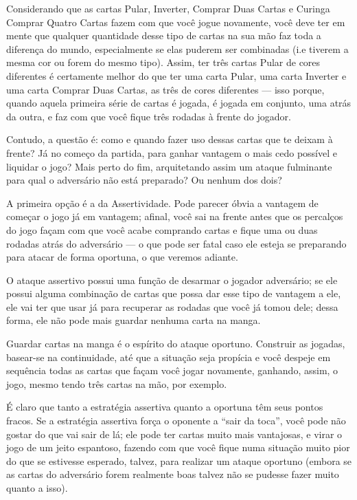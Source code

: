 Considerando que as cartas Pular, Inverter, Comprar Duas Cartas e Curinga Comprar Quatro Cartas fazem com que você jogue novamente, você deve ter em mente que qualquer quantidade desse tipo de cartas na sua mão faz toda a diferença do mundo, especialmente se elas puderem ser combinadas (i.e tiverem a mesma cor ou forem do mesmo tipo). Assim, ter três cartas Pular de cores diferentes é certamente melhor do que ter uma carta Pular, uma carta Inverter e uma carta Comprar Duas Cartas, as três de cores diferentes --- isso porque, quando aquela primeira série de cartas é jogada, é jogada em conjunto, uma atrás da outra, e faz com que você fique três rodadas à frente do jogador.

Contudo, a questão é: como e quando fazer uso dessas cartas que te deixam à frente? Já no começo da partida, para ganhar vantagem o mais cedo possível e liquidar o jogo? Mais perto do fim, arquitetando assim um ataque fulminante para qual o adversário não está preparado? Ou nenhum dos dois?

A primeira opção é a da Assertividade. Pode parecer óbvia a vantagem de começar o jogo já em vantagem; afinal, você sai na frente antes que os percalços do jogo façam com que você acabe comprando cartas e fique uma ou duas rodadas atrás do adversário --- o que pode ser fatal caso ele esteja se preparando para atacar de forma oportuna, o que veremos adiante.

O ataque assertivo possui uma função de desarmar o jogador adversário; se ele possui alguma combinação de cartas que possa dar esse tipo de vantagem a ele, ele vai ter que usar já para recuperar as rodadas que você já tomou dele; dessa forma, ele não pode mais guardar nenhuma carta na manga.

Guardar cartas na manga é o espírito do ataque oportuno. Construir as jogadas, basear-se na continuidade, até que a situação seja propícia e você despeje em sequência todas as cartas que façam você jogar novamente, ganhando, assim, o jogo, mesmo tendo três cartas na mão, por exemplo.

É claro que tanto a estratégia assertiva quanto a oportuna têm seus pontos fracos. Se a estratégia assertiva força o oponente a ``sair da toca'', você pode não gostar do que vai sair de lá; ele pode ter cartas muito mais vantajosas, e virar o jogo de um jeito espantoso, fazendo com que você fique numa situação muito pior do que se estivesse esperado, talvez, para realizar um ataque oportuno (embora se as cartas do adversário forem realmente boas talvez não se pudesse fazer muito quanto a isso).

